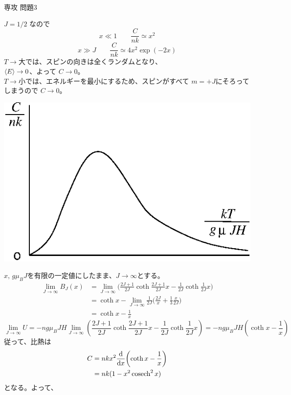 \documentclass[fleqn]{jbook}
\begin{document}
\begin{answer}{専攻 問題3}{}
\begin{subanswers}
\SubAnswer
  \parbox[t]{88mm}{
  $J=1/2$ なので
%
  \[ x\ll 1 \qquad \frac{C}{nk} \simeq x^2  \]
  \[ x\gg J \qquad \frac{C}{nk} \simeq 4x^2 \exp(-2x) \]
%
  $T \rightarrow$大では、スピンの向きは全くランダムとなり、\\
  $\langle{E}\rangle \rightarrow 0$、よって $C \rightarrow 0$。\\
  $T \rightarrow$小では、エネルギーを最小にするため、スピンがすべて
  $m=+J$にそろってしまうので $C \rightarrow 0$。
  }\parbox[t]{75mm}{\vspace*{-5mm}
  \begin{center}
    \mbox{\includegraphics[clip]{1994phy3-2.eps}}
  \end{center}}


\SubAnswer
  $x,\,g \mu_B J$を有限の一定値にしたまま、$J \rightarrow \infty$とする。
%
\begin{align*}
	\lim_{J\rightarrow\infty}B_J(x)
	& = \lim_{J\rightarrow\infty}
		\biggl(\frac{2J+1}{2J}\coth\frac{2J+1}{2J}x
			-\frac{1}{2J}\coth\frac{1}{2J}x\biggr) \\
	& =  \coth x
		-\lim_{J\rightarrow\infty}\frac{1}{2J}
			\biggl(\frac{2J}{x}+\frac{1}{3}\frac{x}{2J}\biggr) \\
	& =  \coth x-\frac{1}{x}
\end{align*}
  \[ \lim_{J\to\infty} U%
      = -ng \mu_B JH \lim_{J\to\infty}%
         \left( \frac{2J+1}{2J}\coth{\frac{2J+1}{2J}x}%
              - \frac{1}{2J}\coth{\frac{1}{2J}x} \right)%
      =  -ng \mu_B JH \left( \coth x -\frac{1}{x} \right) \]
%
従って、比熱は
\begin{align*}
	C & = nkx^2{\frac{{\rm d} }{{\rm d} x}}\biggl(\coth x-\frac{1}{x}\biggr) \\
	& = nk(1-x^2\mathop{\mathrm{cosech}}\nolimits^2x)
\end{align*}
となる。よって、



\end{subanswers}
\end{answer}
\end{document}
